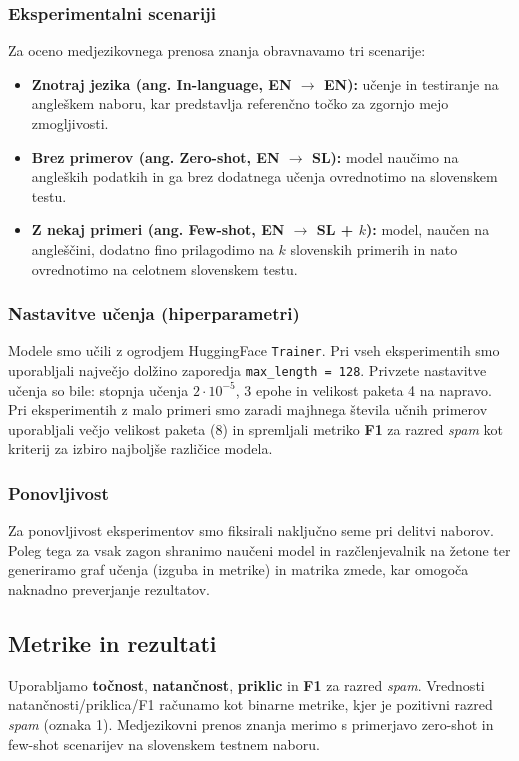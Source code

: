 \documentclass[sigconf,nonacm]{acmart}
\begin{document}
\subsubsection{Eksperimentalni scenariji}
Za oceno medjezikovnega prenosa znanja obravnavamo tri scenarije:
\begin{itemize}
    \item \textbf{Znotraj jezika (ang. In-language, EN $\rightarrow$ EN):} učenje in testiranje na angleškem naboru, kar predstavlja referenčno točko za zgornjo mejo zmogljivosti.
    \item \textbf{Brez primerov (ang. Zero-shot, EN $\rightarrow$ SL):} model naučimo na angleških podatkih in ga brez dodatnega učenja ovrednotimo na slovenskem testu.
    \item \textbf{Z nekaj primeri (ang. Few-shot, EN $\rightarrow$ SL + $k$):} model, naučen na angleščini, dodatno fino prilagodimo na $k$ slovenskih primerih in nato ovrednotimo na celotnem slovenskem testu.
\end{itemize}

\subsubsection{Nastavitve učenja (hiperparametri)}
Modele smo učili z ogrodjem HuggingFace \texttt{Trainer}. Pri vseh eksperimentih smo uporabljali največjo dolžino zaporedja \texttt{max\_length = 128}.
Privzete nastavitve učenja so bile: stopnja učenja $2\cdot 10^{-5}$, $3$ epohe in velikost paketa 4 na napravo.
Pri eksperimentih z malo primeri smo zaradi majhnega števila učnih primerov uporabljali večjo velikost paketa (8) in spremljali metriko \textbf{F1} za razred \emph{spam} kot kriterij za izbiro najboljše različice modela.

\subsubsection{Ponovljivost}
Za ponovljivost eksperimentov smo fiksirali naključno seme pri delitvi naborov. Poleg tega za vsak zagon shranimo naučeni model in razčlenjevalnik na žetone ter generiramo graf učenja (izguba in metrike) in matrika zmede, kar omogoča naknadno preverjanje rezultatov.

\subsection{Metrike in rezultati}
    Uporabljamo \textbf{točnost}, \textbf{natančnost}, \textbf{priklic} in \textbf{F1} za razred \emph{spam}. 
    Vrednosti natančnosti/priklica/F1 računamo kot binarne metrike, kjer je pozitivni razred \emph{spam} (oznaka 1).
    Medjezikovni prenos znanja merimo s primerjavo zero-shot in few-shot scenarijev na slovenskem testnem naboru.
\end{document}
